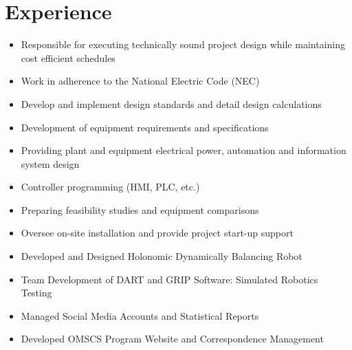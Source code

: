 \documentclass[11pt,letterpaper,sans]{moderncv}        %
\begin{document}
\makecvtitle

\vspace{-10mm}

\section{Experience}

\begin{itemize}
\item Responsible for executing technically sound project design while maintaining cost efficient schedules
\item Work in adherence to the National Electric Code (NEC)
\item Develop and implement design standards and detail design calculations
\item Development of equipment requirements and specifications
\item Providing plant and equipment electrical power, automation and information system design
\item Controller programming (HMI, PLC, etc.)
\item Preparing feasibility studies and equipment comparisons
\item Oversee on-site installation and provide project start-up support
\end{itemize}

\begin{itemize}
\item Developed and Designed Holonomic Dynamically Balancing Robot
\item Team Development of DART and GRIP Software: Simulated Robotics Testing
\end{itemize}

\begin{itemize}
\item Managed Social Media Accounts and Statistical Reports
\item Developed OMSCS Program Website and Correspondence Management
\end{itemize}

\end{document}
